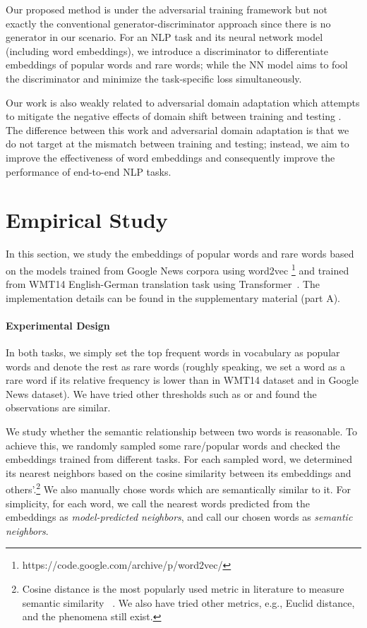 \documentclass{article}
\begin{document}
Our proposed method is under the adversarial training framework but not exactly the conventional generator-discriminator approach since there is no generator in our scenario. For an NLP task and its neural network model (including word embeddings), we introduce a discriminator to differentiate embeddings of popular words and rare words; while the NN model aims to fool the discriminator and minimize the task-specific loss simultaneously.

Our work is also weakly related to adversarial domain adaptation which attempts to mitigate the negative effects of domain shift between training and testing \cite{ganin2015unsupervised,DBLP:conf/cvpr/TzengHSD17}. The difference between this work and adversarial domain adaptation is that we do not target at the mismatch between training and testing; instead, we aim to improve the effectiveness of word embeddings and consequently improve the performance of end-to-end NLP tasks.


\section{Empirical Study}
\label{Empirical-Study}
In this section, we study the embeddings of popular words and rare words based on the models trained from Google News corpora using word2vec \footnote{https://code.google.com/archive/p/word2vec/} and trained from WMT14 English-German translation task using Transformer~\cite{vaswani2017attention}. The implementation details can be found in the supplementary material (part A).

\paragraph{Experimental Design} In both tasks, we simply set the top  frequent words in vocabulary as popular words and denote the rest as rare words (roughly speaking, we set a word as a rare word if its relative frequency is lower than  in WMT14 dataset and  in Google News dataset). We have tried other thresholds such as  or  and found the observations are similar.

We study whether the semantic relationship between two words is reasonable. To achieve this, we randomly sampled some rare/popular words and checked the embeddings trained from different tasks. For each sampled word, we determined its nearest neighbors based on the cosine similarity between its embeddings and others'.\footnote{Cosine distance is the most popularly used metric in literature to measure semantic similarity ~\cite{mikolov2013distributed, DBLP:conf/emnlp/PenningtonSM14, mu2017all}. We also have tried other metrics, e.g., Euclid distance, and the phenomena still exist.} We also manually chose words which are semantically similar to it. For simplicity, for each word, we call the nearest words predicted from the embeddings as \emph{model-predicted neighbors}, and call our chosen words as \emph{semantic neighbors}.
\end{document}
